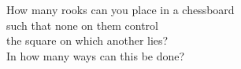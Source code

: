\documentclass[preview]{standalone}
\begin{document}
\begin{center}
How many rooks can you place in a chessboard \\ such that none on them control \\ the square on which another lies?\\ In how many ways can this be done?
\end{center}
\end{document}
